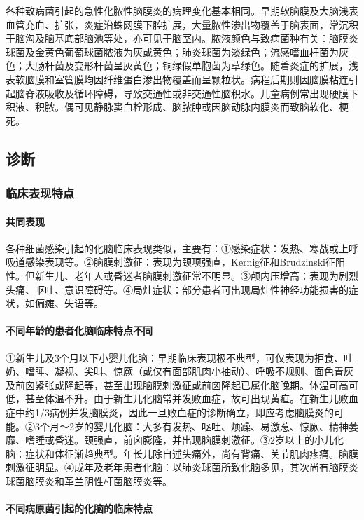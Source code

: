 各种致病菌引起的急性化脓性脑膜炎的病理变化基本相同。早期软脑膜及大脑浅表血管充血、扩张，炎症沿蛛网膜下腔扩展，大量脓性渗出物覆盖于脑表面，常沉积于脑沟及脑基底部脑池等处，亦可见于脑室内。脓液颜色与致病菌种有关：脑膜炎球菌及金黄色葡萄球菌脓液为灰或黄色；肺炎球菌为淡绿色；流感嗜血杆菌为灰色；大肠杆菌及变形杆菌呈灰黄色；铜绿假单胞菌为草绿色。随着炎症的扩展，浅表软脑膜和室管膜均因纤维蛋白渗出物覆盖而呈颗粒状。病程后期则因脑膜粘连引起脑脊液吸收及循环障碍，导致交通性或非交通性脑积水。儿童病例常出现硬膜下积液、积脓。偶可见静脉窦血栓形成、脑脓肿或因脑动脉内膜炎而致脑软化、梗死。

\subsection{诊断}

\subsubsection{临床表现特点}

\paragraph{共同表现}

各种细菌感染引起的化脑临床表现类似，主要有：①感染症状：发热、寒战或上呼吸道感染表现等。②脑膜刺激征：表现为颈项强直，Kernig征和Brudzinski征阳性。但新生儿、老年人或昏迷者脑膜刺激征常不明显。③颅内压增高：表现为剧烈头痛、呕吐、意识障碍等。④局灶症状：部分患者可出现局灶性神经功能损害的症状，如偏瘫、失语等。

\paragraph{不同年龄的患者化脑临床特点不同}

①新生儿及3个月以下小婴儿化脑：早期临床表现极不典型，可仅表现为拒食、吐奶、嗜睡、凝视、尖叫、惊厥（或仅有面部肌肉小抽动）、呼吸不规则、面色青灰及前囟紧张或隆起等，甚至出现脑膜刺激征或前囟隆起已属化脑晚期。体温可高可低，甚至体温不升。由于新生儿化脑常并发败血症，故可出现黄疸。在新生儿败血症中约1/3病例并发脑膜炎，因此一旦败血症的诊断确立，即应考虑脑膜炎的可能。②3个月～2岁的婴儿化脑：大多有发热、呕吐、烦躁、易激惹、惊厥、精神萎靡、嗜睡或昏迷。颈强直，前囟膨隆，并出现脑膜刺激征。③2岁以上的小儿化脑：症状和体征渐趋典型。年长儿除自述头痛外，尚有背痛、关节肌肉疼痛。脑膜刺激征明显。④成年及老年患者化脑：以肺炎球菌所致化脑多见，其次尚有脑膜炎球菌脑膜炎和革兰阴性杆菌脑膜炎等。

\paragraph{不同病原菌引起的化脑的临床特点}

